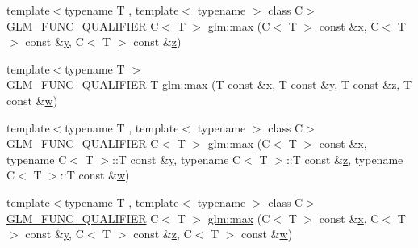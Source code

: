 \begin{DoxyCompactItemize}
\item 
{\footnotesize template$<$typename T , template$<$ typename $>$ class C$>$ }\\\mbox{\hyperlink{setup_8hpp_a33fdea6f91c5f834105f7415e2a64407}{G\+L\+M\+\_\+\+F\+U\+N\+C\+\_\+\+Q\+U\+A\+L\+I\+F\+I\+ER}} C$<$ T $>$ \mbox{\hyperlink{group__gtx__extended__min__max_gaf832e9d4ab4826b2dda2fda25935a3a4}{glm\+::max}} (C$<$ T $>$ const \&\mbox{\hyperlink{_s_d_l__opengl_8h_ad0e63d0edcdbd3d79554076bf309fd47}{x}}, C$<$ T $>$ const \&\mbox{\hyperlink{_s_d_l__opengl_8h_a1675d9d7bb68e1657ff028643b4037e3}{y}}, C$<$ T $>$ const \&\mbox{\hyperlink{_s_d_l__opengl__glext_8h_a5e74030ebb3297ce1b37ff716fedd68f}{z}})
\item 
{\footnotesize template$<$typename T $>$ }\\\mbox{\hyperlink{setup_8hpp_a33fdea6f91c5f834105f7415e2a64407}{G\+L\+M\+\_\+\+F\+U\+N\+C\+\_\+\+Q\+U\+A\+L\+I\+F\+I\+ER}} T \mbox{\hyperlink{group__gtx__extended__min__max_ga78e04a0cef1c4863fcae1a2130500d87}{glm\+::max}} (T const \&\mbox{\hyperlink{_s_d_l__opengl_8h_ad0e63d0edcdbd3d79554076bf309fd47}{x}}, T const \&\mbox{\hyperlink{_s_d_l__opengl_8h_a1675d9d7bb68e1657ff028643b4037e3}{y}}, T const \&\mbox{\hyperlink{_s_d_l__opengl__glext_8h_a5e74030ebb3297ce1b37ff716fedd68f}{z}}, T const \&\mbox{\hyperlink{_s_d_l__opengl__glext_8h_a6ee8f168a7ab6785a9bb57c6715dad99}{w}})
\item 
{\footnotesize template$<$typename T , template$<$ typename $>$ class C$>$ }\\\mbox{\hyperlink{setup_8hpp_a33fdea6f91c5f834105f7415e2a64407}{G\+L\+M\+\_\+\+F\+U\+N\+C\+\_\+\+Q\+U\+A\+L\+I\+F\+I\+ER}} C$<$ T $>$ \mbox{\hyperlink{group__gtx__extended__min__max_ga7cca8b53cfda402040494cdf40fbdf4a}{glm\+::max}} (C$<$ T $>$ const \&\mbox{\hyperlink{_s_d_l__opengl_8h_ad0e63d0edcdbd3d79554076bf309fd47}{x}}, typename C$<$ T $>$\+::T const \&\mbox{\hyperlink{_s_d_l__opengl_8h_a1675d9d7bb68e1657ff028643b4037e3}{y}}, typename C$<$ T $>$\+::T const \&\mbox{\hyperlink{_s_d_l__opengl__glext_8h_a5e74030ebb3297ce1b37ff716fedd68f}{z}}, typename C$<$ T $>$\+::T const \&\mbox{\hyperlink{_s_d_l__opengl__glext_8h_a6ee8f168a7ab6785a9bb57c6715dad99}{w}})
\item 
{\footnotesize template$<$typename T , template$<$ typename $>$ class C$>$ }\\\mbox{\hyperlink{setup_8hpp_a33fdea6f91c5f834105f7415e2a64407}{G\+L\+M\+\_\+\+F\+U\+N\+C\+\_\+\+Q\+U\+A\+L\+I\+F\+I\+ER}} C$<$ T $>$ \mbox{\hyperlink{group__gtx__extended__min__max_gaacffbc466c2d08c140b181e7fd8a4858}{glm\+::max}} (C$<$ T $>$ const \&\mbox{\hyperlink{_s_d_l__opengl_8h_ad0e63d0edcdbd3d79554076bf309fd47}{x}}, C$<$ T $>$ const \&\mbox{\hyperlink{_s_d_l__opengl_8h_a1675d9d7bb68e1657ff028643b4037e3}{y}}, C$<$ T $>$ const \&\mbox{\hyperlink{_s_d_l__opengl__glext_8h_a5e74030ebb3297ce1b37ff716fedd68f}{z}}, C$<$ T $>$ const \&\mbox{\hyperlink{_s_d_l__opengl__glext_8h_a6ee8f168a7ab6785a9bb57c6715dad99}{w}})

\end{DoxyCompactItemize}
